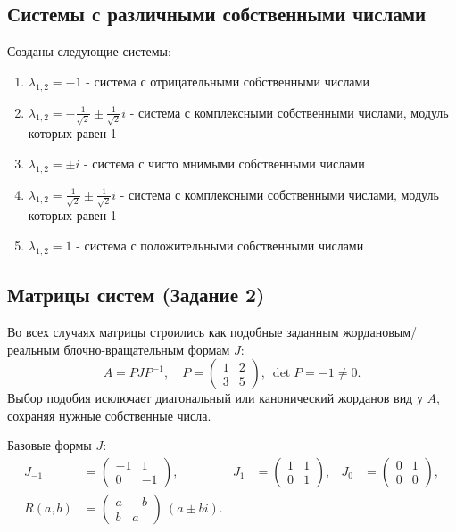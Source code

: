 \subsection*{Системы с различными собственными числами}

Созданы следующие системы:

\begin{enumerate}
    \item $\lambda_{1,2} = -1$ - система с отрицательными собственными числами
    \item $\lambda_{1,2} = -\frac{1}{\sqrt{2}} \pm \frac{1}{\sqrt{2}}i$ - система с комплексными собственными числами, модуль которых равен 1
    \item $\lambda_{1,2} = \pm i$ - система с чисто мнимыми собственными числами
    \item $\lambda_{1,2} = \frac{1}{\sqrt{2}} \pm \frac{1}{\sqrt{2}}i$ - система с комплексными собственными числами, модуль которых равен 1
    \item $\lambda_{1,2} = 1$ - система с положительными собственными числами
\end{enumerate}

\subsection*{Матрицы систем (Задание 2)}

Во всех случаях матрицы строились как подобные заданным жордановым/реальным блочно-вращательным формам $J$:
\[
A = P J P^{-1},\quad P = \begin{pmatrix}1 & 2\\ 3 & 5\end{pmatrix},\ \det P=-1\neq 0.
\]
Выбор подобия исключает диагональный или канонический жорданов вид у $A$, сохраняя нужные собственные числа.

\noindent Базовые формы $J$:
\begin{align}
J_{-1} &= \begin{pmatrix}-1 & 1\\ 0 & -1\end{pmatrix}, &
J_{1} &= \begin{pmatrix}1 & 1\\ 0 & 1\end{pmatrix}, &
J_{0} &= \begin{pmatrix}0 & 1\\ 0 & 0\end{pmatrix}, \\
R(a,b) &= \begin{pmatrix}a & -b\\ b & a\end{pmatrix} \ (a\pm bi).
\end{align}

